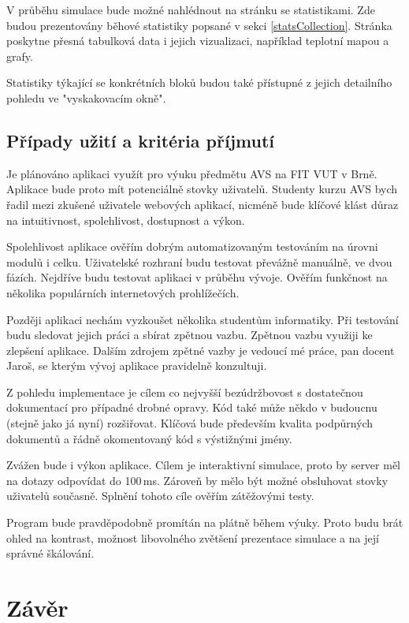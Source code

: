 V průběhu simulace bude možné nahlédnout na stránku se statistikami.
Zde budou prezentovány běhové statistiky popsané v sekci \ref{statsCollection}.
Stránka poskytne přesná tabulková data i jejich vizualizaci, například teplotní mapou a grafy. 

Statistiky týkající se konkrétních bloků budou také přístupné z jejich detailního pohledu ve "vyskakovacím okně". 

\section{Případy užití a kritéria příjmutí}

Je plánováno aplikaci využít pro výuku předmětu AVS na FIT VUT v Brně.
Aplikace bude proto mít potenciálně stovky uživatelů.
Studenty kurzu AVS bych řadil mezi zkušené uživatele webových aplikací, nicméně bude klíčové klást důraz na intuitivnost, spolehlivost, dostupnost a výkon.

Spolehlivost aplikace ověřím dobrým automatizovaným testováním na úrovni modulů i celku.
Uživatelské rozhraní budu testovat převážně manuálně, ve dvou fázích.
Nejdříve budu testovat aplikaci v průběhu vývoje.
Ověřím funkčnost na několika populárních internetových prohlížečích.

Později aplikaci nechám vyzkoušet několika studentům informatiky.
Při testování budu sledovat jejich práci a sbírat zpětnou vazbu.
Zpětnou vazbu využiji ke zlepšení aplikace.
Dalším zdrojem zpětné vazby je vedoucí mé práce, pan docent Jaroš, se kterým vývoj aplikace pravidelně konzultuji. 

Z pohledu implementace je cílem co nejvyšší bezúdržbovost s dostatečnou dokumentací pro případné drobné opravy.
Kód také může někdo v budoucnu (stejně jako já nyní) rozšiřovat.
Klíčová bude především kvalita podpůrných dokumentů a řádně okomentovaný kód s výstižnými jmény.

Zvážen bude i výkon aplikace.
Cílem je interaktivní simulace, proto by server měl na dotazy odpovídat do 100\,ms.
Zároveň by mělo být možné obsluhovat stovky uživatelů současně.
Splnění tohoto cíle ověřím zátěžovými testy.

Program bude pravděpodobně promítán na plátně během výuky.
Proto budu brát ohled na kontrast, možnost libovolného zvětšení prezentace simulace a na její správné škálování.

\chapter{Závěr}

